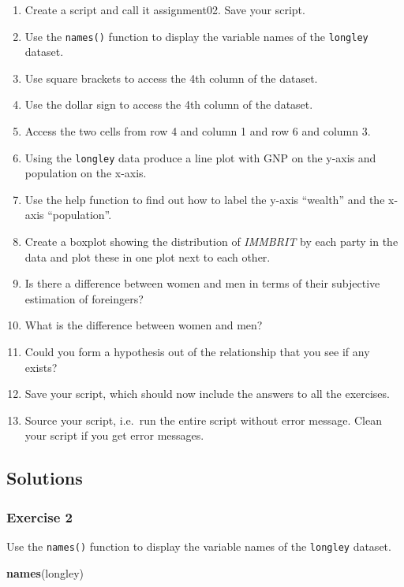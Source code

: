\documentclass[]{article}
\newenvironment{Shaded}{\begin{snugshade}}{\end{snugshade}}
\newcommand{\KeywordTok}[1]{\textcolor[rgb]{0.13,0.29,0.53}{\textbf{#1}}}
\newcommand{\NormalTok}[1]{#1}
\providecommand{\tightlist}{%
  \setlength{\itemsep}{0pt}\setlength{\parskip}{0pt}}
\theoremstyle{definition}
\theoremstyle{definition}
\theoremstyle{definition}
\theoremstyle{remark}
\begin{document}
\begin{enumerate}
\def\labelenumi{\arabic{enumi}.}
\tightlist
\item
  Create a script and call it assignment02. Save your script.
\item
  Use the \texttt{names()} function to display the variable names of the
  \texttt{longley} dataset.
\item
  Use square brackets to access the 4th column of the dataset.
\item
  Use the dollar sign to access the 4th column of the dataset.
\item
  Access the two cells from row 4 and column 1 and row 6 and column 3.
\item
  Using the \texttt{longley} data produce a line plot with GNP on the
  y-axis and population on the x-axis.
\item
  Use the help function to find out how to label the y-axis ``wealth''
  and the x-axis ``population''.
\item
  Create a boxplot showing the distribution of \emph{IMMBRIT} by each
  party in the data and plot these in one plot next to each other.
\item
  Is there a difference between women and men in terms of their
  subjective estimation of foreingers?
\item
  What is the difference between women and men?
\item
  Could you form a hypothesis out of the relationship that you see if
  any exists?
\item
  Save your script, which should now include the answers to all the
  exercises.
\item
  Source your script, i.e.~run the entire script without error message.
  Clean your script if you get error messages.
\end{enumerate}

\subsection{Solutions}\label{solutions-1}

\subsubsection{Exercise 2}\label{exercise-2}

Use the \texttt{names()} function to display the variable names of the
\texttt{longley} dataset.

\begin{Shaded}
\begin{Highlighting}[]
\KeywordTok{names}\NormalTok{(longley)}
\end{Highlighting}
\end{Shaded}
\end{document}
